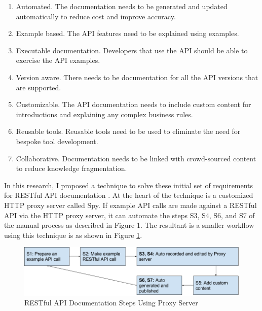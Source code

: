\documentclass[11pt,oneside]{book}
\begin{document}
\begin{enumerate}
  \item Automated. The documentation needs to be generated and updated automatically to reduce cost and improve accuracy.
  \item Example based. The API features need to be explained using examples.
\item   Executable documentation. Developers that use the API should be able to exercise the API examples.
\item   Version aware. There needs to be documentation for all the API versions that are supported.
\item   Customizable. The API documentation needs to include custom content for introductions and explaining any complex business rules.
\item   Reusable tools. Reusable tools need to be used to eliminate the need for bespoke tool development.
\item   Collaborative. Documentation needs to be linked with crowd-sourced content to reduce knowledge fragmentation.
\end{enumerate}

In this research, I proposed a technique to solve these initial set of requirements for RESTful API documentation \cite{sohan2015spyrest}. At the heart of the technique is a customized HTTP proxy server called Spy. If example API calls are made against a RESTful API via the HTTP proxy server, it can automate the steps S3, S4, S6, and S7 of the manual process as described in Figure 1. The resultant is a smaller workflow using this technique is as shown in Figure \ref{fig:proxy_workflow}.

\begin{figure}[bth]
  \includegraphics[width=\linewidth]{proxy_workflow.png}
  \caption{RESTful API Documentation Steps Using Proxy Server}
  \label{fig:proxy_workflow}
\end{figure}
\end{document}
